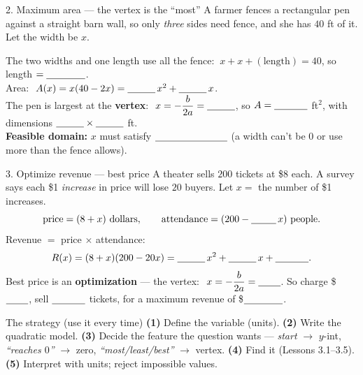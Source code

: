 \documentclass[10pt]{article}
\begin{document}
\begin{notesbox}{2. Maximum area --- the vertex is the ``most''}
A farmer fences a rectangular pen against a straight barn wall, so only \emph{three} sides need fence, and she has
$40$ ft of it. Let the width be $x$.
\begin{center}
\end{center}
The two widths and one length use all the fence: $\ x+x+(\text{length})=40$, so length $=\blank{1.4cm}$. \\[3pt]
Area: $\ A(x)=x(40-2x)=\blank{1.0cm}\,x^2+\blank{1.0cm}\,x$. \\[3pt]
The pen is largest at the \textbf{vertex}: $\ x=-\dfrac{b}{2a}=\blank{1.0cm}$, so $A=\blank{1.2cm}$ ft$^2$, with
dimensions $\blank{1.0cm}\times\blank{1.0cm}$ ft. \\[3pt]
\textbf{Feasible domain:} $x$ must satisfy $\blank{2.6cm}$ (a width can't be $0$ or use more than the fence allows).
\end{notesbox}

\begin{notesbox}{3. Optimize revenue --- best price}
A theater sells $200$ tickets at \$8 each. A survey says each \$1 \emph{increase} in price will lose $20$ buyers.
Let $x=$ the number of \$1 increases.
\[
  \text{price}=(8+x)\text{ dollars},\qquad \text{attendance}=(200-\blank{0.9cm}\,x)\text{ people}.
\]
Revenue $=$ price $\times$ attendance:
\[
  R(x)=(8+x)(200-20x)=\blank{1.0cm}\,x^2+\blank{1.0cm}\,x+\blank{1.2cm}.
\]
Best price is an \textbf{optimization} --- the vertex: $\ x=-\dfrac{b}{2a}=\blank{0.8cm}$. So charge
\$$\blank{0.8cm}$, sell $\blank{1.2cm}$ tickets, for a maximum revenue of \$$\blank{1.4cm}$.
\end{notesbox}

\begin{notesbox}{The strategy (use it every time)}
\small
\textbf{(1)} Define the variable (units). \quad \textbf{(2)} Write the quadratic model. \quad \textbf{(3)} Decide the
feature the question wants --- \emph{start} $\to$ $y$-int, \emph{``reaches $0$''} $\to$ zero, \emph{``most/least/best''}
$\to$ vertex. \quad \textbf{(4)} Find it (Lessons 3.1--3.5). \quad \textbf{(5)} Interpret with units; reject
impossible values.
\end{notesbox}
\end{document}
